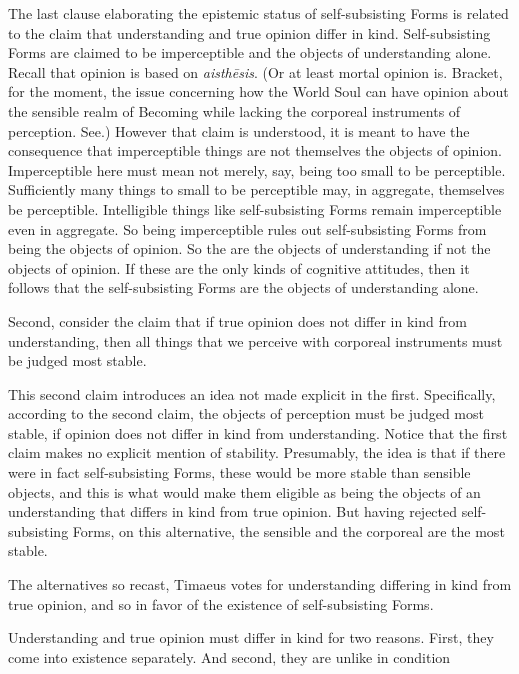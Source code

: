 The last clause elaborating the epistemic status of self-subsisting Forms is related to the claim that understanding and true opinion differ in kind. Self-subsisting Forms are claimed to be imperceptible and the objects of understanding alone. Recall that opinion is based on \emph{aisthēsis}. (Or at least mortal opinion is. Bracket, for the moment, the issue concerning how the World Soul can have opinion about the sensible realm of Becoming while lacking the corporeal instruments of perception. See.) However that claim is understood, it is meant to have the consequence that imperceptible things are not themselves the objects of opinion. Imperceptible here must mean not merely, say, being too small to be perceptible. Sufficiently many things to small to be perceptible may, in aggregate, themselves be perceptible. Intelligible things like self-subsisting Forms remain imperceptible even in aggregate. So being imperceptible rules out self-subsisting Forms from being the objects of opinion. So the are the objects of understanding if not the objects of opinion. If these are the only kinds of cognitive attitudes, then it follows that the self-subsisting Forms are the objects of understanding alone.

Second, consider the claim that if true opinion does not differ in kind from understanding, then all things that we perceive with corporeal instruments must be judged most stable. 

This second claim introduces an idea not made explicit in the first. Specifically, according to the second claim, the objects of perception must be judged most stable, if opinion does not differ in kind from understanding. Notice that the first claim makes no explicit mention of stability. Presumably, the idea is that if there were in fact self-subsisting Forms, these would be more stable than sensible objects, and this is what would make them eligible as being the objects of an understanding that differs in kind from true opinion. But having rejected self-subsisting Forms, on this alternative, the sensible and the corporeal are the most stable.

The alternatives so recast, Timaeus votes for understanding differing in kind from true opinion, and so in favor of the existence of self-subsisting Forms.

Understanding and true opinion must differ in kind for two reasons. First, they come into existence separately. And second, they are unlike in condition


